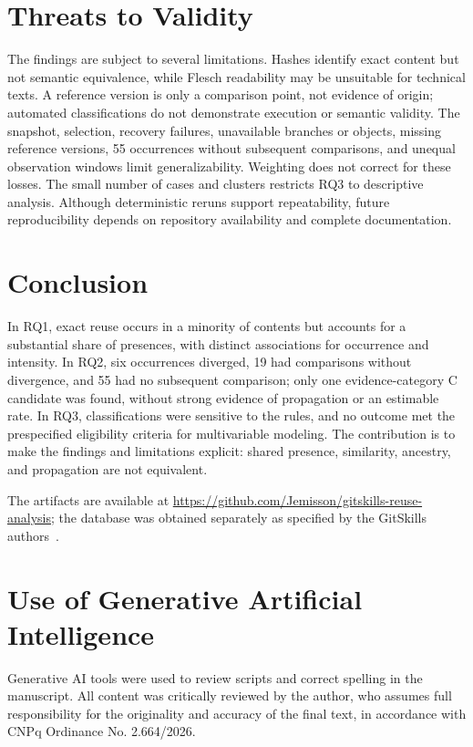 \documentclass[conference]{IEEEtran}
\begin{document}
\section{Threats to Validity}
The findings are subject to several limitations. Hashes identify exact content but not semantic equivalence, while Flesch readability may be unsuitable for technical texts. A reference version is only a comparison point, not evidence of origin; automated classifications do not demonstrate execution or semantic validity. The snapshot, selection, recovery failures, unavailable branches or objects, missing reference versions, 55 occurrences without subsequent comparisons, and unequal observation windows limit generalizability. Weighting does not correct for these losses. The small number of cases and clusters restricts RQ3 to descriptive analysis. Although deterministic reruns support repeatability, future reproducibility depends on repository availability and complete documentation.

\section{Conclusion}
In RQ1, exact reuse occurs in a minority of contents but accounts for a substantial share of presences, with distinct associations for occurrence and intensity. In RQ2, six occurrences diverged, 19 had comparisons without divergence, and 55 had no subsequent comparison; only one evidence-category C candidate was found, without strong evidence of propagation or an estimable rate. In RQ3, classifications were sensitive to the rules, and no outcome met the prespecified eligibility criteria for multivariable modeling. The contribution is to make the findings and limitations explicit: shared presence, similarity, ancestry, and propagation are not equivalent.

The artifacts are available at \url{https://github.com/Jemisson/gitskills-reuse-analysis}; the database was obtained separately as specified by the GitSkills authors~\cite{gitskills}.

\section*{Use of Generative Artificial Intelligence}
Generative AI tools were used to review scripts and correct spelling in the manuscript. All content was critically reviewed by the author, who assumes full responsibility for the originality and accuracy of the final text, in accordance with CNPq Ordinance No. 2.664/2026.
\end{document}
